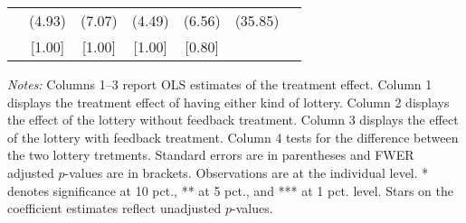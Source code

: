 \begin{table}[ht]
{\begin{threeparttable}
\begin{tabular}{l*{6}{c}}
          &   (4.93)&   (7.07)&   (4.49)&   (6.56)&  (35.85)&         \\
          &   [1.00]&   [1.00]&   [1.00]&   [0.80]&         &         \\
\bottomrule \end{tabular} \begin{tablenotes}[flushleft] \footnotesize \item \emph{Notes:} Columns 1--3 report OLS estimates of the treatment effect. Column 1 displays the treatment effect of having either kind of lottery. Column 2 displays the effect of the lottery without feedback treatment. Column 3 displays the effect of the lottery with feedback treatment. Column 4 tests for the difference between the two lottery tretments. Standard errors are in parentheses and FWER adjusted \(p\)-values are in brackets. Observations are at the individual level. * denotes significance at 10 pct., ** at 5 pct., and *** at 1 pct. level. Stars on the coefficient estimates reflect unadjusted \(p\)-values. \end{tablenotes} \end{threeparttable} } \end{table}

